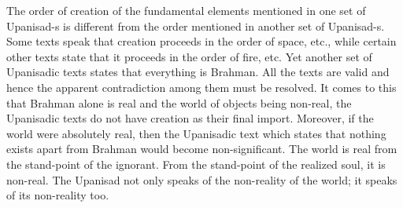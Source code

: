 The order of creation of the fundamental elements mentioned in one set of Upanisad-s is different from the order mentioned in another set of Upanisad-s. Some texts speak that creation proceeds in the order of space, etc., while certain other texts state that it proceeds in the order of fire, etc. Yet another set of Upanisadic texts states that everything is Brahman. All the texts are valid and hence the apparent contradiction among them must be resolved. It comes to this that Brahman alone is real and the world of objects being non-real, the Upanisadic texts do not have creation as their final import. Moreover, if the world were absolutely real, then the Upanisadic text which states that nothing exists apart from Brahman would become non-significant. The world is real from the stand-point of the ignorant. From the stand-point of the realized soul, it is non-real. The Upanisad not only speaks of the non-reality of the world; it speaks of its non-reality too. 


